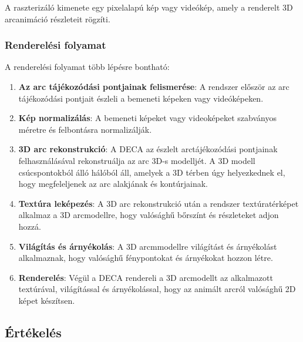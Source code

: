 \documentclass[12pt,a4]{article}
\begin{document}
                A raszterizáló kimenete egy pixelalapú kép vagy videókép, amely a renderelt 3D arcanimáció részleteit rögzíti.

            \subsubsection{Renderelési folyamat}

                A renderelési folyamat több lépésre bontható:

                \begin{enumerate}
                    \item \textbf{Az arc tájékozódási pontjainak felismerése}: A rendszer először az arc tájékozódási pontjait észleli a bemeneti képeken vagy videóképeken. 

                    \item \textbf{Kép normalizálás}: A bemeneti képeket vagy videoképeket szabványos méretre és felbontásra normalizálják.

                    \item \textbf{3D arc rekonstrukció}: A DECA az észlelt arctájékozódási pontjainak felhasználásával rekonstruálja az arc 3D-s modelljét. A 3D modell csúcspontokból álló hálóból áll, amelyek a 3D térben úgy helyezkednek el, hogy megfeleljenek az arc alakjának és kontúrjainak.

                    \item \textbf{Textúra leképezés}: A 3D arc rekonstrukció után a rendszer textúratérképet alkalmaz a 3D arcmodellre, hogy valósághű bőrszínt és részleteket adjon hozzá.

                    \item \textbf{Világítás és árnyékolás}: A 3D arcmmodellre világítást és árnyékolást alkalmaznak, hogy valósághű fénypontokat és árnyékokat hozzon létre. 

                    \item \textbf{Renderelés}: Végül a DECA rendereli a 3D arcmodellt az alkalmazott textúrával, világítással és árnyékolással, hogy az animált arcról valósághű 2D képet készítsen.
                    
                \end{enumerate}
                
 	      \subsection{Értékelés}
\end{document}
